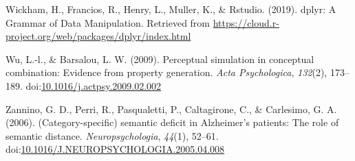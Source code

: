 \documentclass[man]{apa6}
\begin{document}
\leavevmode\hypertarget{ref-Wickham2019}{}%
Wickham, H., Francios, R., Henry, L., Muller, K., \& Rstudio. (2019). dplyr: A Grammar of Data Manipulation. Retrieved from \url{https://cloud.r-project.org/web/packages/dplyr/index.html}

\leavevmode\hypertarget{ref-Wu2009}{}%
Wu, L.-l., \& Barsalou, L. W. (2009). Perceptual simulation in conceptual combination: Evidence from property generation. \emph{Acta Psychologica}, \emph{132}(2), 173--189. doi:\href{https://doi.org/10.1016/j.actpsy.2009.02.002}{10.1016/j.actpsy.2009.02.002}

\leavevmode\hypertarget{ref-Zannino2006}{}%
Zannino, G. D., Perri, R., Pasqualetti, P., Caltagirone, C., \& Carlesimo, G. A. (2006). (Category-specific) semantic deficit in Alzheimer's patients: The role of semantic distance. \emph{Neuropsychologia}, \emph{44}(1), 52--61. doi:\href{https://doi.org/10.1016/J.NEUROPSYCHOLOGIA.2005.04.008}{10.1016/J.NEUROPSYCHOLOGIA.2005.04.008}

\endgroup
\end{document}
